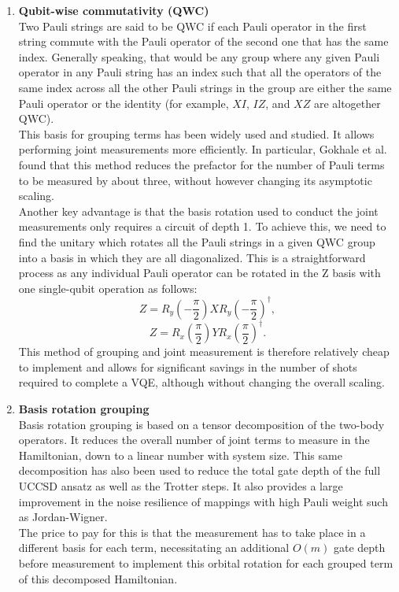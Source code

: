 \begin{enumerate}
    \item \textbf{Qubit-wise commutativity (QWC)} \\
    Two Pauli strings are said to be QWC if each Pauli operator in the first string commute with the Pauli operator of the second one that has the same index. Generally speaking, that would be any group where any given Pauli operator in any Pauli string has an index such that all the operators of the same index across all the other Pauli strings in the group are either the same Pauli operator or the identity (for example, $XI$, $IZ$, and $XZ$ are altogether QWC). \\
    This basis for grouping terms has been widely used and studied. It allows performing joint measurements more efficiently. In particular, Gokhale et al. \cite{Gokhale2019Jul} found that this method reduces the prefactor for the number of Pauli terms to be measured by about three, without however changing its asymptotic scaling. \\
    Another key advantage is that the basis rotation used to conduct the joint measurements only requires a circuit of depth 1. To achieve this, we need to find the unitary which rotates all the Pauli strings in a given QWC group into a basis in which they are all diagonalized. This is a straightforward process as any individual Pauli operator can be rotated in the Z basis with one single-qubit operation as follows:
    \begin{equation}
        Z = R_y\left( -\frac{\pi}{2} \right) X R_y\left( -\frac{\pi}{2} \right)^{\dagger},
    \end{equation}
    \begin{equation}
        Z = R_x\left( \frac{\pi}{2} \right) Y R_x\left( \frac{\pi}{2} \right)^{\dagger}.
    \end{equation}
    This method of grouping and joint measurement is therefore relatively cheap to implement and allows for significant savings in the number of shots required to complete a VQE, although without changing the overall scaling.
    
    \item \textbf{Basis rotation grouping} \\
    Basis rotation grouping is based on a tensor decomposition of the two-body operators. It reduces the overall number of joint terms to measure in the Hamiltonian, down to a linear number with system size. This same decomposition has also been used to reduce the total gate depth of the full UCCSD ansatz as well as the Trotter steps. It also provides a large improvement in the noise resilience of mappings with high Pauli weight such as Jordan-Wigner. \\
    The price to pay for this is that the measurement has to take place in a different basis for each term, necessitating an additional $O(m)$ gate depth before measurement to implement this orbital rotation for each grouped term of this decomposed Hamiltonian.
\end{enumerate}
